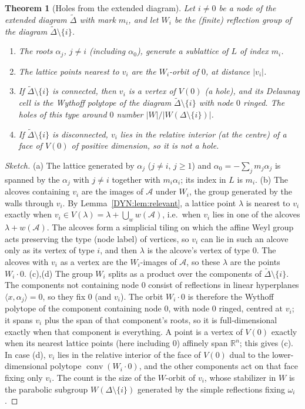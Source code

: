 \documentclass[11pt,openany]{book}
\theoremstyle{plain}
\newtheorem{theorem}{Theorem}[chapter]
\theoremstyle{definition}
\theoremstyle{remark}
\newcommand{\R}{\mathbb{R}}
\newcommand{\conv}{\operatorname{conv}}
\newcommand{\abs}[1]{\left\lvert #1 \right\rvert}
\newcommand{\ip}[2]{\langle #1, #2\rangle}
\begin{document}
\begin{theorem}[Holes from the extended diagram]\label{DYN:thm:holes}
Let $i\neq0$ be a node of the extended diagram $\tilde\Delta$ with mark $m_i$, and let $W_i$ be the
(finite) reflection group of the diagram $\tilde\Delta\setminus\{i\}$.
\begin{enumerate}[label=(\alph*)]
\item The roots $\alpha_j$, $j\neq i$ (including $\alpha_0$), generate a sublattice of $L$ of index $m_i$.
\item The lattice points nearest to $v_i$ are the $W_i$-orbit of $0$, at distance $\abs{v_i}$.
\item If $\tilde\Delta\setminus\{i\}$ is connected, then $v_i$ is a vertex of $V(0)$ (a hole), and its
  Delaunay cell is the Wythoff polytope of the diagram $\tilde\Delta\setminus\{i\}$ with node $0$ ringed.
  The holes of this type around $0$ number $\abs W/\abs{W(\Delta\setminus\{i\})}$.
\item If $\tilde\Delta\setminus\{i\}$ is disconnected, $v_i$ lies in the relative interior (at the
  centre) of a face of $V(0)$ of positive dimension, so it is not a hole.
\end{enumerate}
\end{theorem}

\begin{proof}[Sketch]
(a) The lattice generated by $\alpha_j$ ($j\ne i$, $j\ge1$) and $\alpha_0=-\sum_jm_j\alpha_j$ is spanned by
the $\alpha_j$ with $j\ne i$ together with $m_i\alpha_i$; its index in $L$ is $m_i$.
(b) The alcoves containing $v_i$ are the images of $\mathcal A$ under $W_i$, the group generated by the
walls through $v_i$. By Lemma~\ref{DYN:lem:relevant}, a lattice point $\lambda$ is nearest to $v_i$ exactly
when $v_i\in V(\lambda)=\lambda+\bigcup_ww(\mathcal A)$, i.e.\ when $v_i$ lies in one of the alcoves
$\lambda+w(\mathcal A)$. The alcoves form a simplicial tiling on which the affine Weyl group acts
preserving the type (node label) of vertices, so $v_i$ can lie in such an alcove only as its vertex of
type $i$, and then $\lambda$ is the alcove's vertex of type $0$. The alcoves with $v_i$ as a vertex are
the $W_i$-images of $\mathcal A$, so these $\lambda$ are the points $W_i\cdot0$.
(c),(d) The group $W_i$ splits as a product over the components of $\tilde\Delta\setminus\{i\}$. The
components not containing node $0$ consist of reflections in linear hyperplanes $\ip x{\alpha_j}=0$, so
they fix $0$ (and $v_i$). The orbit $W_i\cdot0$ is therefore the Wythoff polytope of the component
containing node $0$, with node $0$ ringed, centred at $v_i$; it spans $v_i$ plus the span of that
component's roots, so it is full-dimensional exactly when that component is everything. A point is a
vertex of $V(0)$ exactly when its nearest lattice points (here including $0$) affinely span $\R^n$; this
gives (c). In case (d), $v_i$ lies in the relative interior of the face of $V(0)$ dual to the
lower-dimensional polytope $\conv(W_i\cdot0)$, and the other components act on that face fixing only
$v_i$. The count is the size of the $W$-orbit of $v_i$, whose stabilizer in $W$ is the parabolic
subgroup $W(\Delta\setminus\{i\})$ generated by the simple reflections fixing $\omega_i$.
\end{proof}
\end{document}
